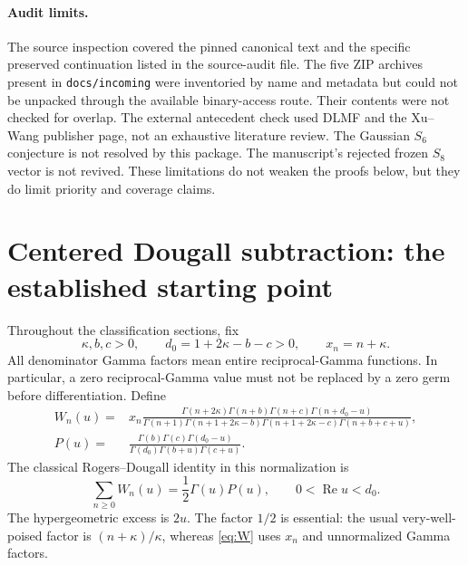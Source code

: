 \documentclass[11pt,a4paper]{article}
\numberwithin{equation}{section}
\theoremstyle{definition}\newtheorem{definition}[theorem]{Definition}
\theoremstyle{remark}\newtheorem{remark}[theorem]{Remark}
\newcommand{\Repart}{\operatorname{Re}}
\begin{document}
\paragraph{Audit limits.}
The source inspection covered the pinned canonical text and the specific
preserved continuation listed in the source-audit file. The five ZIP
archives present in \texttt{docs/incoming} were inventoried by name and
metadata but could not be unpacked through the available binary-access
route. Their contents were not checked for overlap. The external
antecedent check used DLMF and the Xu--Wang publisher page, not an
exhaustive literature review. The Gaussian $S_6$ conjecture is not
resolved by this package. The manuscript's rejected frozen $S_8$ vector
is not revived. These limitations do not weaken the proofs below, but
they do limit priority and coverage claims.

\section{Centered Dougall subtraction: the established starting point}
\label{sec:starting}
Throughout the classification sections, fix
\begin{equation}
 \kappa,b,c>0,\qquad d_0=1+2\kappa-b-c>0,\qquad x_n=n+\kappa.
 \label{eq:positive-domain}
\end{equation}
All denominator Gamma factors mean entire reciprocal-Gamma functions.
In particular, a zero reciprocal-Gamma value must not be replaced by a
zero germ before differentiation. Define
\begin{align}
 W_n(u)={}&x_n\frac{\Gamma(n+2\kappa)\Gamma(n+b)\Gamma(n+c)
                         \Gamma(n+d_0-u)}
 {\Gamma(n+1)\Gamma(n+1+2\kappa-b)\Gamma(n+1+2\kappa-c)
                         \Gamma(n+b+c+u)},\label{eq:W}\\
 P(u)={}&\frac{\Gamma(b)\Gamma(c)\Gamma(d_0-u)}
 {\Gamma(d_0)\Gamma(b+u)\Gamma(c+u)}.\label{eq:P}
\end{align}
The classical Rogers--Dougall identity in this normalization is
\begin{equation}
 \sum_{n\ge0}W_n(u)=\frac12\Gamma(u)P(u),
 \qquad 0<\Repart u<d_0.
 \label{eq:dougall}
\end{equation}
The hypergeometric excess is $2u$. The factor $1/2$ is essential: the
usual very-well-poised factor is $(n+\kappa)/\kappa$, whereas
\eqref{eq:W} uses $x_n$ and unnormalized Gamma factors.
\end{document}
